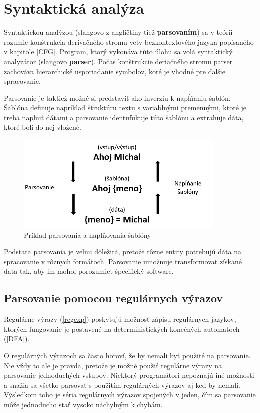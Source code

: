 \chapter{Syntaktická analýza}
Syntaktickou analýzou (slangovo z angličtiny tiež \textbf{parsovaním}) sa v teórii rozumie konštrukcia derivačného stromu vety bezkontextového jazyka\cite{CVUT:program_language} popísaného v kapitole \ref{CFG}. Program, ktorý vykonáva túto úlohu sa volá syntaktický analyzátor (slangovo \textbf{parser}). Počas konštrukcie deriačného stromu parser zachováva hierarchické usporiadanie symbolov, koré je vhodné pre ďalšie spracovanie.

Parsovanie je taktiež možné si predstaviť ako inverziu k napĺňaniu šablón. Šablóna definuje napríklad štruktúru textu s variablnými premennými, ktoré je treba naplniť dátami a parsovanie identufukuje túto šablónu a extrahuje dáta, ktoré boli do nej vložené.

\begin{figure}[H]
\begin{center}
\includegraphics[width=10cm]{figures/templatingAndParsing.PNG}
\caption{Príklad parsovania a naplňovania šablóny}
\label{fig:templatingAndParsing}
\end{center}
\end{figure}

Podstata parsovania je veľmi dôležitá, pretože rôzne entity potrebujú dáta na spracovanie v rôznych formátoch. Parsovanie umožnuje transformovat získané data tak, aby im mohol porozumieť špecifický software. 

\section{Parsovanie pomocou regulárnych výrazov}
Regulárne výrazy (\ref{regexp}) poskytujú možnosť zápisu regulárnych jazykov, ktorých fungovanie je postavené na deterministických konečných automatoch (\ref{DFA}).

O regulárných výrazoch sa často horoví, že by nemali byť použité na parsovanie. Nie vždy to ale je pravda, pretože je možné použiť regulárne výrazy na parsovanie jednoduchých vstupov. Niektorý programátori nepoznajú iné možnosti a snažia sa všetko parsovať s použitím regulárných výrazov aj keď by nemali. Výsledkom toho je séria regulárnych výrazov spojených v jeden, čím sa parsovanie môže jednoducho stať vysoko náchylným k chybám.

